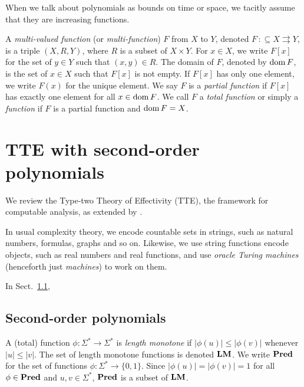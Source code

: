 \documentclass[envcountsame,orivec,oribibl]{llncs}
\newcommand{\pcolon}{\mathpunct{\,:\subseteq}}
\begin{document}
When we talk about polynomials as bounds on time or space, 
we tacitly assume that they are increasing functions. 

A {\em multi-valued function} (or {\em multi-function}) $F$ from $X$ to $Y$,
denoted $F \pcolon X \rightrightarrows Y$,
is a triple $(X, R, Y)$, where $R$ is a subset of $X \times Y$.
For $x \in X$, we write $F[x]$ for the set of $y \in Y$ such that $(x,y) \in R$.
The domain of $F$, denoted by $\mathop{\rm dom} F$, is the set of $x \in X$ such that 
$F[x]$ is not empty.
If $F[x]$ has only one element, we write $F(x)$ for the unique element.
We say $F$ is a {\em partial function} if $F[x]$ has exactly one element for all
$x \in \mathop{\rm dom} F$.
We call $F$ a {\em total function} or simply a {\em function} 
if $F$ is a partial function and $\mathop{\rm dom} F = X$.


\section{TTE with second-order polynomials}
\label{section: computable analysis}

We review the Type-two Theory of Effectivity (TTE), 
the framework for computable analysis, 
as extended by 
\cite{kawamura2012complexity}. 

In usual complexity theory, we encode countable sets in strings, such as
natural numbers, formulas, graphs and so on. 
Likewise, 
we use string functions encode objects, such as real numbers and real functions, 
and use \emph{oracle Turing machines} (henceforth just \emph{machines}) 
to work on them.

In Sect.~\ref{section:TTF}, 

\subsection{Second-order polynomials}
\label{section:TTF}

A (total) function $\phi \colon \Sigma^* \to \Sigma^*$ is \emph{length monotone}
if $|\phi(u)| \le |\phi(v)|$ whenever $|u| \le |v|$.
The set of length monotone functions is denoted $\mathbf{LM}$.
We write $\mathbf{Pred}$ for the set of functions $\phi \colon \Sigma^* \to \{0, 1\}$.
Since $|\phi(u)| = |\phi(v)| = 1$ for all $\phi \in \mathbf{Pred}$ and $u, v \in \Sigma^*$,
$\mathbf{Pred}$ is a subset of $\mathbf{LM}$.
\end{document}
